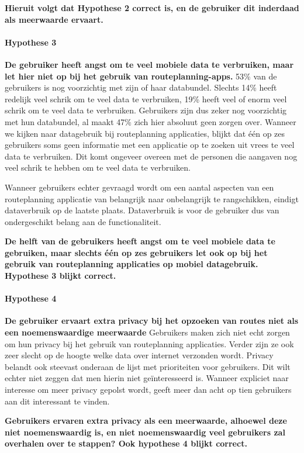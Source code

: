\textbf{Hieruit volgt dat Hypothese 2 correct is, en de gebruiker dit inderdaad als meerwaarde ervaart. }	

\paragraph{Hypothese 3}\textbf{ De gebruiker heeft angst om te veel mobiele data te verbruiken, maar let hier niet op bij het gebruik van routeplanning-apps.}
    53\% van de gebruikers is nog voorzichtig met zijn of haar databundel. Slechts 14\% heeft redelijk veel schrik om te veel data te verbruiken, 19\% heeft veel of enorm veel schrik om te veel data te verbruiken. Gebruikers zijn dus zeker nog voorzichtig met hun databundel, al maakt 47\% zich hier absoluut geen zorgen over.
    Wanneer we kijken naar datagebruik bij routeplanning applicaties, blijkt dat één op zes gebruikers soms geen informatie met een applicatie op te zoeken uit vrees te veel data te verbruiken. Dit komt ongeveer overeen met de personen die aangaven nog veel schrik te hebben om te veel data te verbruiken.
    
    Wanneer gebruikers echter gevraagd wordt om een aantal aspecten van een routeplanning applicatie van belangrijk naar onbelangrijk te rangschikken, eindigt dataverbruik op de laatste plaats. Dataverbruik is voor de gebruiker dus van ondergeschikt belang aan de functionaliteit.
    
\textbf{De helft van de gebruikers heeft angst om te veel mobiele data te gebruiken, maar slechts één op zes gebruikers let ook op bij het gebruik van routeplanning applicaties op mobiel datagebruik. Hypothese 3 blijkt correct.}

\paragraph{Hypothese 4}\textbf{De gebruiker ervaart extra privacy bij het opzoeken van routes niet als een noemenswaardige meerwaarde}
	Gebruikers maken zich niet echt zorgen om hun privacy bij het gebruik van routeplanning applicaties. Verder zijn ze ook zeer slecht op de hoogte welke data over internet verzonden wordt. Privacy belandt ook steevast onderaan de lijst met prioriteiten voor gebruikers. Dit wilt echter niet zeggen dat men hierin niet geïnteresseerd is. Wanneer expliciet naar interesse om meer privacy gepolst wordt, geeft meer dan acht op tien gebruikers aan dit interessant te vinden.
	
	\textbf{Gebruikers ervaren extra privacy als een meerwaarde, alhoewel deze niet noemenswaardig is, en niet noemenswaardig veel gebruikers zal overhalen over te stappen? Ook hypothese 4 blijkt correct.}